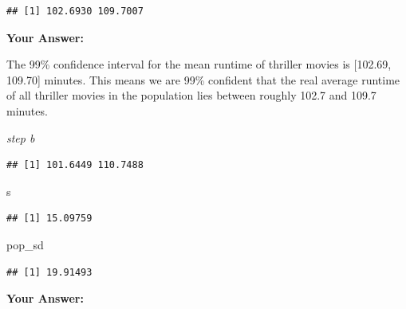 \documentclass[
]{article}
\newenvironment{Shaded}{\begin{snugshade}}{\end{snugshade}}
\newcommand{\AttributeTok}[1]{\textcolor[rgb]{0.13,0.29,0.53}{#1}}
\newcommand{\ConstantTok}[1]{\textcolor[rgb]{0.56,0.35,0.01}{#1}}
\newcommand{\FloatTok}[1]{\textcolor[rgb]{0.00,0.00,0.81}{#1}}
\newcommand{\FunctionTok}[1]{\textcolor[rgb]{0.13,0.29,0.53}{\textbf{#1}}}
\newcommand{\NormalTok}[1]{#1}
\newcommand{\OtherTok}[1]{\textcolor[rgb]{0.56,0.35,0.01}{#1}}
\newcommand{\SpecialCharTok}[1]{\textcolor[rgb]{0.81,0.36,0.00}{\textbf{#1}}}
\begin{document}
\begin{verbatim}
## [1] 102.6930 109.7007
\end{verbatim}

\textbf{Your Answer:}

The 99\% confidence interval for the mean runtime of thriller movies is
{[}102.69, 109.70{]} minutes. This means we are 99\% confident that the
real average runtime of all thriller movies in the population lies
between roughly 102.7 and 109.7 minutes.

\emph{step b}

\begin{Shaded}
\end{Shaded}

\begin{verbatim}
## [1] 101.6449 110.7488
\end{verbatim}

\begin{Shaded}
\begin{Highlighting}[]
\NormalTok{s}
\end{Highlighting}
\end{Shaded}

\begin{verbatim}
## [1] 15.09759
\end{verbatim}

\begin{Shaded}
\begin{Highlighting}[]
\NormalTok{pop\_sd}
\end{Highlighting}
\end{Shaded}

\begin{verbatim}
## [1] 19.91493
\end{verbatim}

\textbf{Your Answer:}
\end{document}
